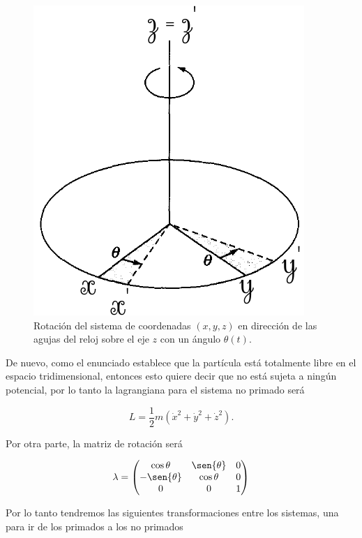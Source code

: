\documentclass[a4paper,10pt]{article}
\numberwithin{equation}{section}
\begin{document}
\begin{figure}[H]
 \center 
 \includegraphics[scale=0.44]{problema2fig1}
 \caption{Rotación del sistema de coordenadas $(x,y,z)$ en dirección de las agujas 
 del reloj sobre el eje $z$ con un ángulo $\theta(t)$.}
 \label{fig:problema2fig1}
\end{figure}

De nuevo, como el enunciado establece que la partícula está totalmente libre en el espacio
tridimensional, entonces esto quiere decir que no está sujeta a ningún potencial, 
por lo tanto la lagrangiana para el sistema no primado será

\begin{equation}
 L = \frac{1}{2}m (\dot{x}^2 + \dot{y}^2 + \dot{z}^2).
\end{equation}

Por otra parte, la matriz de rotación será 

\begin{equation}
 \lambda = \begin{pmatrix}
          \cos{\theta} & \sen{\theta} & 0 \\
          -\sen{\theta} & \cos{\theta} & 0 \\
          0 & 0 & 1
          \end{pmatrix}
\end{equation}

Por lo tanto tendremos las siguientes transformaciones entre los sistemas, una 
para ir de los primados a los no primados
\end{document}
